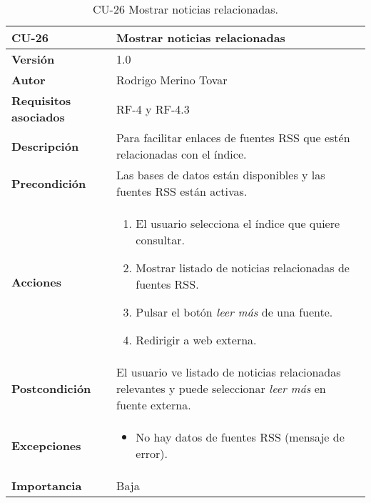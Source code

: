 \begin{table}[p]
	\centering
	\begin{tabularx}{\linewidth}{ p{} p{} }
		\toprule
		\textbf{CU-26}    & \textbf{Mostrar noticias relacionadas}\\
		\toprule
		\textbf{Versión}              & 1.0    \\
		\textbf{Autor}                & Rodrigo Merino Tovar \\
		\textbf{Requisitos asociados} & RF-4 y RF-4.3 \\
		\textbf{Descripción}          & Para facilitar enlaces de fuentes RSS que estén relacionadas con el índice.\\
		\textbf{Precondición}         & Las bases de datos están disponibles y las fuentes RSS están activas.  \\
		\textbf{Acciones}             &
		\begin{enumerate}
			\def\labelenumi{\arabic{enumi}.}
			\tightlist 
			\item El usuario selecciona el índice que quiere consultar. 
			\item Mostrar listado de noticias relacionadas de fuentes RSS.
			\item Pulsar el botón \emph{leer más} de una fuente.
			\item Redirigir a web externa. 
		\end{enumerate}\\
		\textbf{Postcondición}        & El usuario ve listado de noticias relacionadas relevantes y puede seleccionar \emph{leer más} en fuente externa. \\
		\textbf{Excepciones}          & 
		\begin{itemize}
			\tightlist
			\item No hay datos de fuentes RSS (mensaje de error).
		\end{itemize} \\
		\textbf{Importancia}          & Baja \\
		\bottomrule
	\end{tabularx}
	\caption{CU-26 Mostrar noticias relacionadas.}
\end{table}


